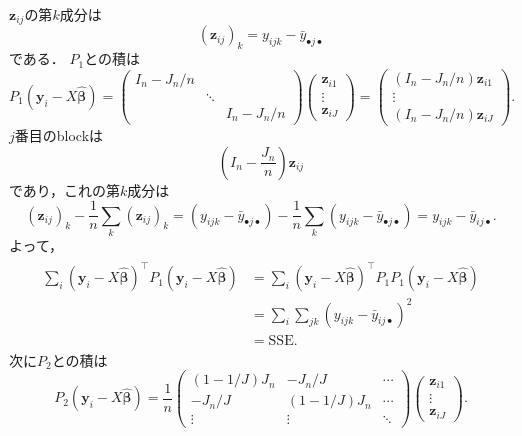 \(\boldsymbol{z}_{ij}\)の第\(k\)成分は
\[ (\boldsymbol{z}_{ij})_k = y_{ijk} - \bar{y}_{\bullet j \bullet} \]
である．
\(P_1\)との積は
\[
  P_1 (\boldsymbol{y}_i - X \hat{\boldsymbol\beta})
  =
  \begin{pmatrix}
    I_n - J_n/n & & \\
    & \ddots & \\
    & & I_n - J_n/n
  \end{pmatrix}
  \begin{pmatrix}
    \boldsymbol{z}_{i1} \\ \vdots \\  \boldsymbol{z}_{iJ}
  \end{pmatrix}
  =
  \begin{pmatrix}
    (I_n - J_n/n) \boldsymbol{z}_{i1} \\
    \vdots \\
    (I_n - J_n/n) \boldsymbol{z}_{iJ}
  \end{pmatrix}
  .
\]
\(j\)番目のblockは
\[ \left( I_n - \frac{J_n}{n} \right) \boldsymbol{z}_{ij} \]
であり，これの第\(k\)成分は
\[
(\boldsymbol{z}_{ij})_k - \frac{1}{n} \sum_k (\boldsymbol{z}_{ij})_k
= (y_{ijk} - \bar{y}_{\bullet j \bullet}) - \frac{1}{n} \sum_k (y_{ijk} - \bar{y}_{\bullet j \bullet})
= y_{ijk} - \bar{y}_{ij\bullet} .
\]
よって，
\begin{align}
  \begin{split}
    \sum_i (\boldsymbol{y}_i - X \hat{\boldsymbol\beta})^\top P_1 (\boldsymbol{y}_i - X \hat{\boldsymbol\beta})
    &= \sum_i(\boldsymbol{y}_i - X \hat{\boldsymbol\beta})^\top P_1 P_1 (\boldsymbol{y}_i - X \hat{\boldsymbol\beta}) \\
    &= \sum_i \sum_{jk} (y_{ijk} - \bar{y}_{ij\bullet} )^2 \\
    &= \text{SSE} .
  \end{split}
  \label{12_49_p1_sse}
\end{align}
次に\(P_2\)との積は
\[
  P_2 (\boldsymbol{y}_i - X \hat{\boldsymbol\beta})
  = \frac{1}{n}
  \begin{pmatrix}
    (1-1/J) J_n & - J_n/J & \cdots \\
    - J_n/J & (1-1/J) J_n & \cdots \\
    \vdots & \vdots & \ddots
  \end{pmatrix}
  \begin{pmatrix}
    \boldsymbol{z}_{i1} \\ \vdots \\  \boldsymbol{z}_{iJ}
  \end{pmatrix}
  .
\]
